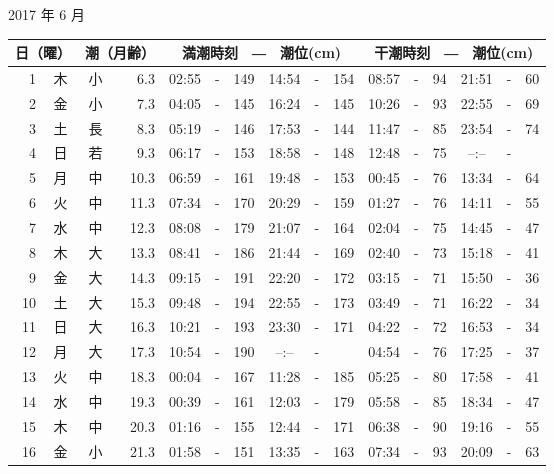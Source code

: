 \documentclass[12pt.a4j]{jsarticle}
\begin{document}
\begin{center}
 {\large 2017 年  6 月}\\
 \begin{table}[ht]
    \begin{tabular}{|rc|cr|ccrccr|ccrccr|}
    \hline
    \multicolumn{2}{|c|}{日（曜）} & \multicolumn{2}{c|}{潮（月齢）} & \multicolumn{6}{c|}{満潮時刻　―　潮位(cm)} & \multicolumn{6}{c|}{干潮時刻　―　潮位(cm)} \\
 \hline
 1 & 木 & 小 &  6.3 &  02:55 &-& 149  &  14:54 &-& 154  &   08:57 &-&  94  &   21:51 &-&  60  \\
 2 & 金 & 小 &  7.3 &  04:05 &-& 145  &  16:24 &-& 145  &   10:26 &-&  93  &   22:55 &-&  69  \\
 3 & 土 & 長 &  8.3 &  05:19 &-& 146  &  17:53 &-& 144  &   11:47 &-&  85  &   23:54 &-&  74  \\
 4 & 日 & 若 &  9.3 &  06:17 &-& 153  &  18:58 &-& 148  &   12:48 &-&  75  &   --:-- &-&     \\
 5 & 月 & 中 & 10.3 &  06:59 &-& 161  &  19:48 &-& 153  &   00:45 &-&  76  &   13:34 &-&  64  \\
 6 & 火 & 中 & 11.3 &  07:34 &-& 170  &  20:29 &-& 159  &   01:27 &-&  76  &   14:11 &-&  55  \\
 7 & 水 & 中 & 12.3 &  08:08 &-& 179  &  21:07 &-& 164  &   02:04 &-&  75  &   14:45 &-&  47  \\
 8 & 木 & 大 & 13.3 &  08:41 &-& 186  &  21:44 &-& 169  &   02:40 &-&  73  &   15:18 &-&  41  \\
 9 & 金 & 大 & 14.3 &  09:15 &-& 191  &  22:20 &-& 172  &   03:15 &-&  71  &   15:50 &-&  36  \\
10 & 土 & 大 & 15.3 &  09:48 &-& 194  &  22:55 &-& 173  &   03:49 &-&  71  &   16:22 &-&  34  \\
11 & 日 & 大 & 16.3 &  10:21 &-& 193  &  23:30 &-& 171  &   04:22 &-&  72  &   16:53 &-&  34  \\
12 & 月 & 大 & 17.3 &  10:54 &-& 190  &  --:-- &-&     &   04:54 &-&  76  &   17:25 &-&  37  \\
13 & 火 & 中 & 18.3 &  00:04 &-& 167  &  11:28 &-& 185  &   05:25 &-&  80  &   17:58 &-&  41  \\
14 & 水 & 中 & 19.3 &  00:39 &-& 161  &  12:03 &-& 179  &   05:58 &-&  85  &   18:34 &-&  47  \\
15 & 木 & 中 & 20.3 &  01:16 &-& 155  &  12:44 &-& 171  &   06:38 &-&  90  &   19:16 &-&  55  \\
16 & 金 & 小 & 21.3 &  01:58 &-& 151  &  13:35 &-& 163  &   07:34 &-&  93  &   20:09 &-&  63  \\

\end{tabular}
\end{table}
\end{center}
\end{document}
